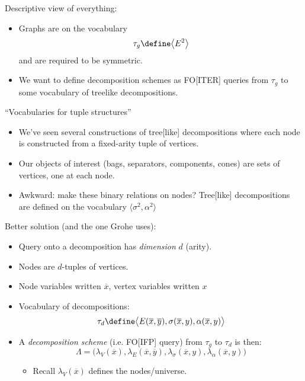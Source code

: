 \documentclass{beamer}
\begin{document}
\begin{frame}
  Descriptive view of everything:
  \begin{itemize}
  \item Graphs are on the vocabulary
    \begin{equation*}
      \tau_g \define \bigl\langle E^2 \bigr\rangle
    \end{equation*}
    and are required to be symmetric.
    \pause
    \item We want to define decomposition schemes as FO[ITER] queries
      from $\tau_g$ to some vocabulary of treelike decompositions.
  \end{itemize}
\end{frame}


\begin{frame}
  ``Vocabularies for tuple structures''
  \begin{itemize}
  \item We've seen several constructions of tree[like] decompositions where
    each node is constructed from a fixed-arity tuple of vertices.
  \item Our objects of interest (bags, separators, components, cones) are
    sets of vertices, one at each node.
    \pause
  \item Awkward: make these binary relations on nodes?  Tree[like]
    decompositions are defined on the vocabulary $\bigl\langle \sigma^2,
      \alpha^2 \bigr\rangle$
  \end{itemize}
\end{frame}

\begin{frame}
  Better solution (and the one Grohe uses):
  \begin{itemize}
  \item Query onto a decomposition has \emph{dimension} $d$ (arity).
  \item Nodes are $d$-tuples of vertices.
  \item Node variables written $\overline{x}$, vertex variables written
    $x$
    \pause
  \item Vocabulary of decompositions:
    \begin{equation*}
      \tau_{d} \define \bigl\langle E(\overline{x}, \overline{y}),
        \sigma(\overline{x}, y), \alpha(\overline{x}, y) \bigr\rangle
    \end{equation*}
    \pause
  \item A \emph{decomposition scheme} (i.e. FO[IFP] query) from $\tau_{g}$
    to $\tau_d$ is then:
    \begin{equation*}
      \Lambda = \bigl(\lambda_V(\overline{x}), \lambda_E(\overline{x},
      \overline{y}), \lambda_\sigma(\overline{x}, y),
      \lambda_\alpha(\overline{x}, y)\bigr)
    \end{equation*}
    \begin{itemize}
    \item Recall $\lambda_V(\overline{x})$ defines the nodes/universe.
    \end{itemize}
  \end{itemize}
\end{frame}
\end{document}
